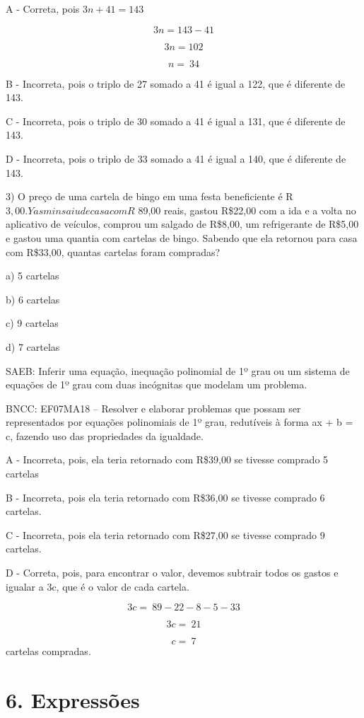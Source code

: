 A - Correta, pois \(3n + 41 = 143\)

\[3n = 143 - 41\]

\[3n = 102\]

\[n = \ 34\]

B - Incorreta, pois o triplo de 27 somado a 41 é igual a 122, que é
diferente de 143.

C - Incorreta, pois o triplo de 30 somado a 41 é igual a 131, que é
diferente de 143.

D - Incorreta, pois o triplo de 33 somado a 41 é igual a 140, que é
diferente de 143.

3) O preço de uma cartela de bingo em uma festa beneficiente é
R\(3,00. Yasmin saiu de casa com R\) 89,00 reais, gastou R\$22,00 com a
ida e a volta no aplicativo de veículos, comprou um salgado de R\$8,00,
um refrigerante de R\$5,00 e gastou uma quantia com cartelas de bingo.
Sabendo que ela retornou para casa com R\$33,00, quantas cartelas foram
compradas?

a) 5 cartelas

b) 6 cartelas

c) 9 cartelas

d) 7 cartelas

SAEB: Inferir uma equação, inequação polinomial de 1º grau ou um sistema
de equações de 1º grau com duas incógnitas que modelam um problema.

BNCC: EF07MA18 -- Resolver e elaborar problemas que possam ser
representados por equações polinomiais de 1º grau, redutíveis à forma ax
+ b = c, fazendo uso das propriedades da igualdade.

A - Incorreta, pois, ela teria retornado com R\$39,00 se tivesse
comprado 5 cartelas

B - Incorreta, pois ela teria retornado com R\$36,00 se tivesse comprado
6 cartelas.

C - Incorreta, pois ela teria retornado com R\$27,00 se tivesse comprado
9 cartelas.

D - Correta, pois, para encontrar o valor, devemos subtrair todos os
gastos e igualar a 3c, que é o valor de cada cartela.

\[3c = \ 89 - 22 - 8 - 5 - 33\]

\[3c = \ 21\]

\[c = \ 7\] cartelas compradas.

\hypertarget{expressuxf5es}{%
\section{6. Expressões}\label{expressuxf5es}}


